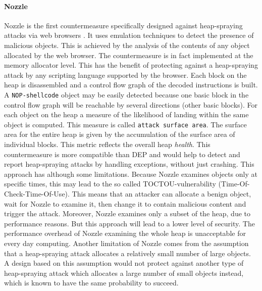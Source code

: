 \paragraph{Nozzle} 
Nozzle is the first countermeasure specifically designed against heap-spraying attacks via web browsers \cite{nozzle08tr}. It uses emulation techniques to detect the presence of malicious objects. This is achieved by the analysis of the contents of any object allocated by the web browser. The countermeasure is in fact implemented at the memory allocator level. This has the benefit of protecting against a heap-spraying attack by any scripting language supported by the browser.
Each block on the heap is disassembled and a control flow graph of the decoded instructions is built. A \texttt{NOP-shellcode} object may be easily detected because one basic block in the control flow graph will be reachable by several directions (other basic blocks). For each object on the heap a measure of the likelihood of landing within the same object is computed. This measure is called \texttt{attack surface area}. The surface area for the entire heap is given by the accumulation of the surface area of individual blocks. This metric reflects the overall heap \textit{health}. 
This countermeasure is more compatible than DEP and would help to detect and report heap-spraying attacks by handling exceptions, without just crashing. This approach has although some limitations. Because Nozzle examines objects only at specific times, this may lead to the so called TOCTOU-vulnerability (Time-Of-Check-Time-Of-Use). This means that an attacker can allocate a benign object, wait for Nozzle to examine it, then change it to contain malicious content and trigger the attack. Moreover, Nozzle examines only a subset of the heap, due to performance reasons. But this approach will lead to a lower level of security. The performance overhead of Nozzle examining the whole heap is unacceptable for every day computing.
Another limitation of Nozzle comes from the assumption that a heap-spraying attack allocates a relatively small number of large objects. A design based on this assumption would not protect against another type of heap-spraying attack which allocates a large number of small objects instead, which is known to have the same probability to succeed. 


